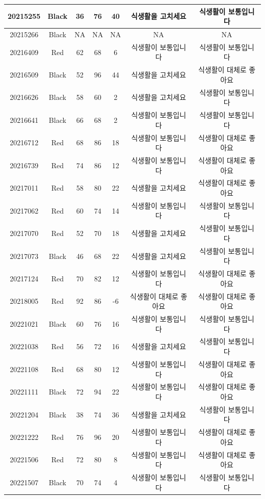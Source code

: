 \documentclass[
]{book}
\begin{document}
\begin{tabular}{c|c|c|c|c|c|c}
\hline
20215255 & Black & 36 & 76 & 40 & 식생활을 고치세요 & 식생활이 보통입니다\\
\hline
20215266 & Black & NA & NA & NA & NA & NA\\
\hline
20216409 & Red & 62 & 68 & 6 & 식생활이 보통입니다 & 식생활이 보통입니다\\
\hline
20216509 & Black & 52 & 96 & 44 & 식생활을 고치세요 & 식생활이 대체로 좋아요\\
\hline
20216626 & Black & 58 & 60 & 2 & 식생활을 고치세요 & 식생활이 보통입니다\\
\hline
20216641 & Black & 66 & 68 & 2 & 식생활이 보통입니다 & 식생활이 보통입니다\\
\hline
20216712 & Red & 68 & 86 & 18 & 식생활이 보통입니다 & 식생활이 대체로 좋아요\\
\hline
20216739 & Red & 74 & 86 & 12 & 식생활이 보통입니다 & 식생활이 대체로 좋아요\\
\hline
20217011 & Red & 58 & 80 & 22 & 식생활을 고치세요 & 식생활이 대체로 좋아요\\
\hline
20217062 & Red & 60 & 74 & 14 & 식생활이 보통입니다 & 식생활이 보통입니다\\
\hline
20217070 & Red & 52 & 70 & 18 & 식생활을 고치세요 & 식생활이 보통입니다\\
\hline
20217073 & Black & 46 & 68 & 22 & 식생활을 고치세요 & 식생활이 보통입니다\\
\hline
20217124 & Red & 70 & 82 & 12 & 식생활이 보통입니다 & 식생활이 대체로 좋아요\\
\hline
20218005 & Red & 92 & 86 & -6 & 식생활이 대체로 좋아요 & 식생활이 대체로 좋아요\\
\hline
20221021 & Black & 60 & 76 & 16 & 식생활이 보통입니다 & 식생활이 보통입니다\\
\hline
20221038 & Red & 56 & 72 & 16 & 식생활을 고치세요 & 식생활이 보통입니다\\
\hline
20221108 & Red & 68 & 80 & 12 & 식생활이 보통입니다 & 식생활이 대체로 좋아요\\
\hline
20221111 & Black & 72 & 94 & 22 & 식생활이 보통입니다 & 식생활이 대체로 좋아요\\
\hline
20221204 & Black & 38 & 74 & 36 & 식생활을 고치세요 & 식생활이 보통입니다\\
\hline
20221222 & Red & 76 & 96 & 20 & 식생활이 보통입니다 & 식생활이 대체로 좋아요\\
\hline
20221506 & Red & 72 & 80 & 8 & 식생활이 보통입니다 & 식생활이 대체로 좋아요\\
\hline
20221507 & Black & 70 & 74 & 4 & 식생활이 보통입니다 & 식생활이 보통입니다\\

\end{tabular}
\end{document}
